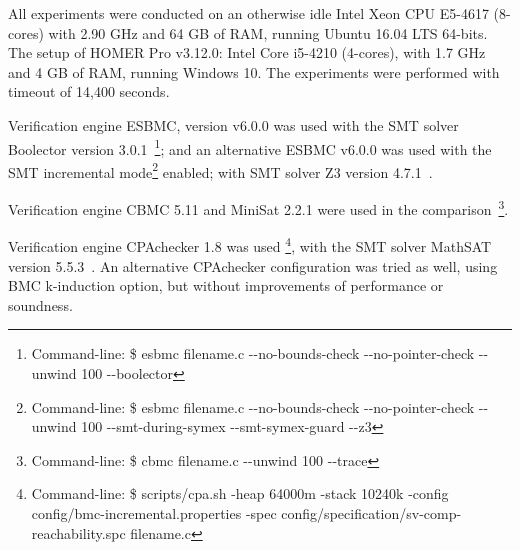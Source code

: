 \documentclass[review]{elsarticle}
\begin{document}
%
All experiments were conducted on an otherwise idle Intel Xeon CPU E5-4617 (8-cores) with 2.90 GHz and 64 GB of RAM, running Ubuntu 16.04 LTS 64-bits. The setup of HOMER Pro v3.12.0: Intel Core i5-4210 (4-cores), with 1.7 GHz and 4 GB of RAM, running Windows 10. The experiments were performed with timeout of 14,400 seconds.

Verification engine ESBMC, version v6.0.0 was used with the SMT solver Boolector version 3.0.1~\citep{Brummayer}\footnote{Command-line: \$ esbmc filename.c -\phantom{}-no-bounds-check -\phantom{}-no-pointer-check -\phantom{}-unwind 100 -\phantom{}-boolector}; and an alternative ESBMC v6.0.0 was used with the SMT incremental mode\footnote{Command-line: \$ esbmc filename.c -\phantom{}-no-bounds-check -\phantom{}-no-pointer-check -\phantom{}-unwind 100 -\phantom{}-smt-during-symex -\phantom{}-smt-symex-guard -\phantom{}-z3} enabled; %
with SMT solver Z3 version 4.7.1~\citep{DeMoura}.

Verification engine CBMC 5.11 and MiniSat 2.2.1 were used in the comparison~\citep{Kroening}\footnote{Command-line: \$ cbmc filename.c -\phantom{}-unwind 100 -\phantom{}-trace}.
 
Verification engine CPAchecker 1.8 was used \footnote{Command-line: \$ scripts/cpa.sh -heap 64000m -stack 10240k -config config/bmc-incremental.properties -spec config/specification/sv-comp-reachability.spc filename.c}, with the SMT solver MathSAT version 5.5.3~\citep{mathsat5}. An alternative CPAchecker configuration was tried as well, using BMC k-induction option, but without improvements of performance or soundness.

\end{document}
